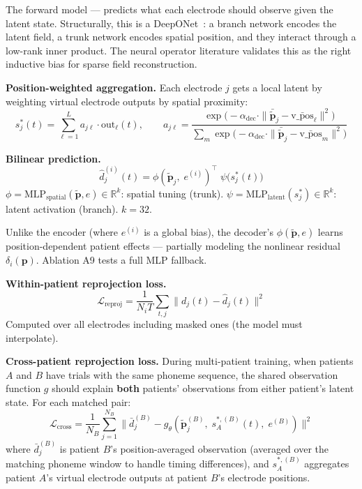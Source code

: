 \documentclass[11pt,letterpaper]{article}
\newcommand{\bfp}{\mathbf{p}}
\newcommand{\R}{\mathbb{R}}
\begin{document}
The forward model --- predicts what each electrode should observe given the latent state. Structurally, this is a DeepONet~\cite{lu2021}: a branch network encodes the latent field, a trunk network encodes spatial position, and they interact through a low-rank inner product. The neural operator literature validates this as the right inductive bias for sparse field reconstruction.

\textbf{Position-weighted aggregation.} Each electrode $j$ gets a local latent by weighting virtual electrode outputs by spatial proximity:
\begin{equation}
s_j^*(t) = \sum_{\ell=1}^{L} a_{j\ell} \cdot \text{out}_\ell(t), \qquad
a_{j\ell} = \frac{\exp\bigl(-\alpha_{\text{dec}} \cdot \|\bar{\tilde{\bfp}}_j - \bar{\text{v\_pos}}_\ell\|^2\bigr)}
             {\sum_{m} \exp\bigl(-\alpha_{\text{dec}} \cdot \|\bar{\tilde{\bfp}}_j - \bar{\text{v\_pos}}_m\|^2\bigr)}
\end{equation}

\textbf{Bilinear prediction.}
\begin{equation}\label{eq:bilinear}
\hat{d}_j^{(i)}(t) = \phi(\tilde{\bfp}_j,\; e^{(i)})^\top \;\psi\bigl(s_j^*(t)\bigr)
\end{equation}
$\phi = \text{MLP}_{\text{spatial}}(\tilde{\bfp}, e) \in \R^k$: spatial tuning (trunk). $\psi = \text{MLP}_{\text{latent}}(s_j^*) \in \R^k$: latent activation (branch). $k{=}32$.

Unlike the encoder (where $e^{(i)}$ is a global bias), the decoder's $\phi(\tilde{\bfp}, e)$ learns position-dependent patient effects --- partially modeling the nonlinear residual $\delta_i(\bfp)$. Ablation A9 tests a full MLP fallback.

\textbf{Within-patient reprojection loss.}
\begin{equation}
\mathcal{L}_{\text{reproj}} = \frac{1}{N_i T} \sum_{t,j} \bigl\| d_j(t) - \hat{d}_j(t) \bigr\|^2
\end{equation}
Computed over all electrodes including masked ones (the model must interpolate).

\textbf{Cross-patient reprojection loss.}\label{sec:cross-reproj}
During multi-patient training, when patients $A$ and $B$ have trials with the same phoneme sequence, the shared observation function $g$ should explain \textbf{both} patients' observations from either patient's latent state. For each matched pair:
\begin{equation}
\mathcal{L}_{\text{cross}} = \frac{1}{N_B} \sum_{j=1}^{N_B} \bigl\| \bar{d}_j^{(B)} - g_\theta(\tilde{\bfp}_j^{(B)},\; s_A^{*,(B)}(t),\; e^{(B)}) \bigr\|^2
\end{equation}
where $\bar{d}_j^{(B)}$ is patient $B$'s position-averaged observation (averaged over the matching phoneme window to handle timing differences), and $s_A^{*,(B)}$ aggregates patient $A$'s virtual electrode outputs at patient $B$'s electrode positions.
\end{document}
